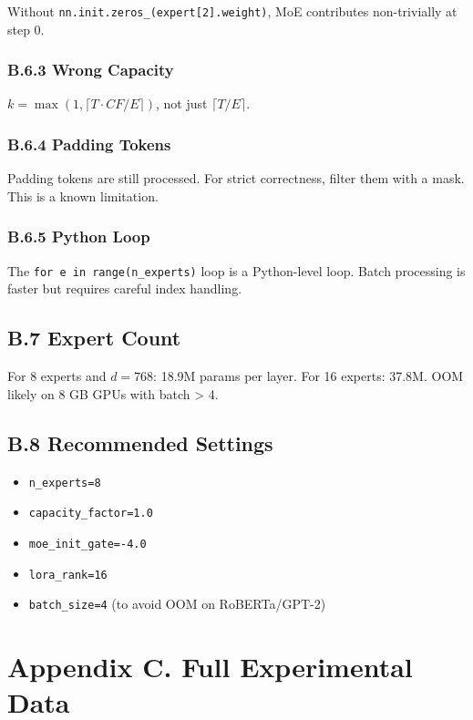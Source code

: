 Without \texttt{nn.init.zeros\_(expert[2].weight)}, MoE contributes non-trivially 
at step 0.

\subsubsection{B.6.3 Wrong Capacity}

$k = \max(1, \lceil T \cdot CF / E \rceil)$, not just $\lceil T/E \rceil$.

\subsubsection{B.6.4 Padding Tokens}

Padding tokens are still processed. For strict correctness, filter them 
with a mask. This is a known limitation.

\subsubsection{B.6.5 Python Loop}

The \texttt{for e in range(n\_experts)} loop is a Python-level loop. Batch 
processing is faster but requires careful index handling.

\subsection{B.7 Expert Count}

For 8 experts and $d = 768$: 18.9M params per layer. For 16 experts: 
37.8M. OOM likely on 8 GB GPUs with batch > 4.

\subsection{B.8 Recommended Settings}

\begin{itemize}
\item \texttt{n\_experts=8}
\item \texttt{capacity\_factor=1.0}
\item \texttt{moe\_init\_gate=-4.0}
\item \texttt{lora\_rank=16}
\item \texttt{batch\_size=4} (to avoid OOM on RoBERTa/GPT-2)

\end{itemize}


\section{Appendix C. Full Experimental Data}


